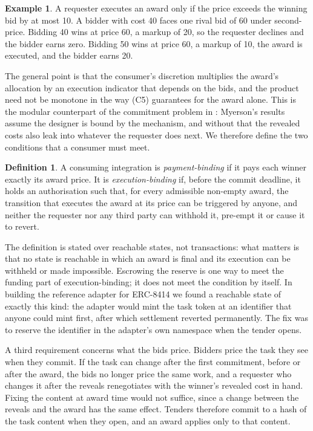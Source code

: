 \documentclass[11pt]{article}
\theoremstyle{definition}
\newtheorem{definition}{Definition}
\newtheorem{example}{Example}
\theoremstyle{remark}
\begin{document}
\begin{example}
\label{ex:discretion}
A requester executes an award only if the price exceeds the winning bid by at most 10. A bidder with cost 40 faces one rival bid of 60 under second-price. Bidding 40 wins at price 60, a markup of 20, so the requester declines and the bidder earns zero. Bidding 50 wins at price 60, a markup of 10, the award is executed, and the bidder earns 20.
\end{example}

The general point is that the consumer's discretion multiplies the award's allocation by an execution indicator that depends on the bids, and the product need not be monotone in the way (C5) guarantees for the award alone. This is the modular counterpart of the commitment problem in \citet{mcafee1997}: Myerson's results assume the designer is bound by the mechanism, and without that the revealed costs also leak into whatever the requester does next. We therefore define the two conditions that a consumer must meet.

\begin{definition}
A consuming integration is \emph{payment-binding} if it pays each winner exactly its award price. It is \emph{execution-binding} if, before the commit deadline, it holds an authorisation such that, for every admissible non-empty award, the transition that executes the award at its price can be triggered by anyone, and neither the requester nor any third party can withhold it, pre-empt it or cause it to revert.
\end{definition}

The definition is stated over reachable states, not transactions: what matters is that no state is reachable in which an award is final and its execution can be withheld or made impossible. Escrowing the reserve is one way to meet the funding part of execution-binding; it does not meet the condition by itself. In building the reference adapter for ERC-8414 we found a reachable state of exactly this kind: the adapter would mint the task token at an identifier that anyone could mint first, after which settlement reverted permanently. The fix was to reserve the identifier in the adapter's own namespace when the tender opens.

A third requirement concerns what the bids price. Bidders price the task they see when they commit. If the task can change after the first commitment, before or after the award, the bids no longer price the same work, and a requester who changes it after the reveals renegotiates with the winner's revealed cost in hand. Fixing the content at award time would not suffice, since a change between the reveals and the award has the same effect. Tenders therefore commit to a hash of the task content when they open, and an award applies only to that content.
\end{document}
